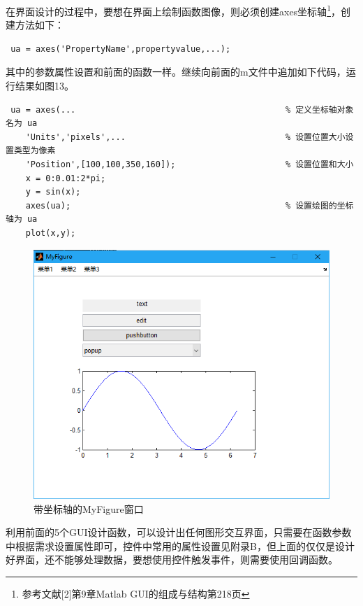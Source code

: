 \begin{enumerate}
	\qquad 在界面设计的过程中，要想在界面上绘制函数图像，则必须创建axes坐标轴\footnote{参考文献[2]第9章Matlab GUI的组成与结构第218页}，创建方法如下：
	\begin{lstlisting}
 ua = axes('PropertyName',propertyvalue,...);\end{lstlisting}
 	其中的参数属性设置和前面的函数一样。继续向前面的m文件中追加如下代码，运行结果如图13。
	 \begin{lstlisting}
 ua = axes(...											% 定义坐标轴对象名为 ua
	'Units','pixels',...								% 设置位置大小设置类型为像素
	'Position',[100,100,350,160]);						% 设置位置和大小
	x = 0:0.01:2*pi;
	y = sin(x);
	axes(ua);											% 设置绘图的坐标轴为 ua
	plot(x,y);\end{lstlisting}
	\begin{figure}[H]
		\centering
		\includegraphics[scale=0.35]{MyFigure_axes}
		\caption{带坐标轴的MyFigure窗口}
	\end{figure}
\end{enumerate}

利用前面的5个GUI设计函数，可以设计出任何图形交互界面，只需要在函数参数中根据需求设置属性即可，控件中常用的属性设置见附录B，但上面的仅仅是设计好界面，还不能够处理数据，要想使用控件触发事件，则需要使用回调函数。
